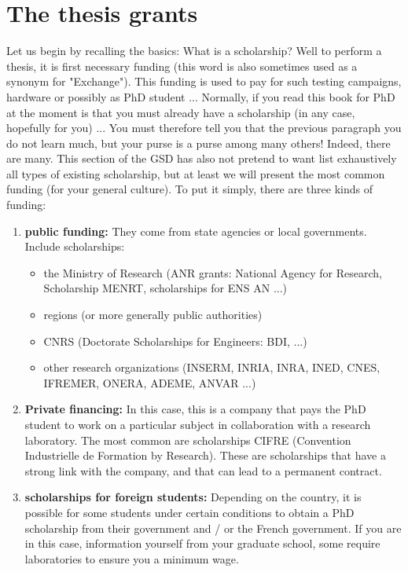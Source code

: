 \section{The thesis grants}
Let us begin by recalling the basics: What is a scholarship?
Well to perform a thesis, it is first necessary funding (this word is also sometimes used as a synonym for "Exchange").
This funding is used to pay for such testing campaigns, hardware or possibly as PhD student ...
Normally, if you read this book for PhD at the moment is that you must already have a scholarship (in any case, hopefully for you) ...
You must therefore tell you that the previous paragraph you do not learn much, but your purse is a purse among many others!
Indeed, there are many.
This section of the GSD has also not pretend to want list exhaustively all types of existing scholarship, but at least we will present the most common funding (for your general culture).
To put it simply, there are three kinds of funding:
\begin{enumerate}
  \item \textbf{public funding:} They come from state agencies or local governments. Include scholarships:
  \begin{itemize}
    \item the Ministry of Research (ANR grants: National Agency for Research, Scholarship MENRT, scholarships for ENS AN ...)
    \item regions (or more generally public authorities)
    \item CNRS (Doctorate Scholarships for Engineers: BDI, ...)
    \item other research organizations (INSERM, INRIA, INRA, INED, CNES, IFREMER, ONERA, ADEME, ANVAR ...)
  \end{itemize}
  \item \textbf{Private financing:} In this case, this is a company that pays the PhD student to work on a particular subject in collaboration with a research laboratory. The most common are scholarships CIFRE (Convention Industrielle de Formation by Research). These are scholarships that have a strong link with the company, and that can lead to a permanent contract.
  \item \textbf{scholarships for foreign students:} Depending on the country, it is possible for some students under certain conditions to obtain a PhD scholarship from their government and / or the French government. If you are in this case, information yourself from your graduate school, some require laboratories to ensure you a minimum wage.
\end{enumerate}

